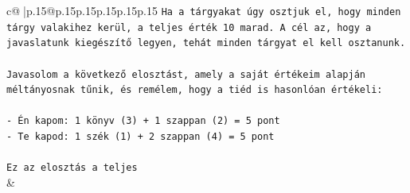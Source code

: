 \documentclass{article}
\begin{document}
{\begin{supertabular}{c@{$\;$}|p{.15\linewidth}@{}p{.15\linewidth}p{.15\linewidth}p{.15\linewidth}p{.15\linewidth}p{.15\linewidth}}
{{{\texttt{Ha a tárgyakat úgy osztjuk el, hogy minden tárgy valakihez kerül, a teljes érték 10 marad. A cél az, hogy a javaslatunk kiegészítő legyen, tehát minden tárgyat el kell osztanunk.} \\
\\ 
\texttt{Javasolom a következő elosztást, amely a saját értékeim alapján méltányosnak tűnik, és remélem, hogy a tiéd is hasonlóan értékeli:} \\
\\ 
\texttt{{-} Én kapom: 1 könyv (3) + 1 szappan (2) = 5 pont} \\
\texttt{{-} Te kapod: 1 szék (1) + 2 szappan (4) = 5 pont} \\
\\ 
\texttt{Ez az elosztás a teljes} \\
            }
        }
    }
    & \\ \\


\end{supertabular}}
\end{document}
